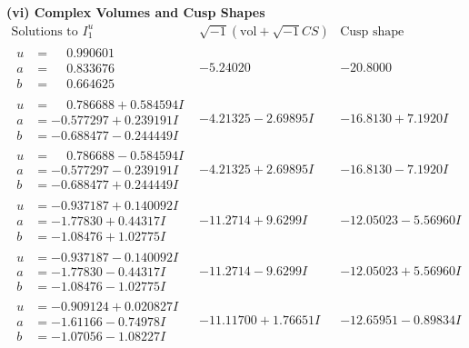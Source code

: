 \documentclass[1p]{elsarticle_modified}
\theoremstyle{definition}
\newcommand{\I}{\sqrt{-1}}
\begin{document}
\newpage\flushleft \textbf{(vi) Complex Volumes and Cusp Shapes}
$$\begin{array}{c|c|c}  
\text{Solutions to }I^u_{1}& \I (\text{vol} + \sqrt{-1}CS) & \text{Cusp shape}\\
 \hline 
\begin{aligned}
u &= \phantom{-}0.990601\phantom{ +0.000000I} \\
a &= \phantom{-}0.833676\phantom{ +0.000000I} \\
b &= \phantom{-}0.664625\phantom{ +0.000000I}\end{aligned}
 & -5.24020\phantom{ +0.000000I} & -20.8000\phantom{ +0.000000I} \\ \hline\begin{aligned}
u &= \phantom{-}0.786688 + 0.584594 I \\
a &= -0.577297 + 0.239191 I \\
b &= -0.688477 - 0.244449 I\end{aligned}
 & -4.21325 - 2.69895 I & -16.8130 + 7.1920 I \\ \hline\begin{aligned}
u &= \phantom{-}0.786688 - 0.584594 I \\
a &= -0.577297 - 0.239191 I \\
b &= -0.688477 + 0.244449 I\end{aligned}
 & -4.21325 + 2.69895 I & -16.8130 - 7.1920 I \\ \hline\begin{aligned}
u &= -0.937187 + 0.140092 I \\
a &= -1.77830 + 0.44317 I \\
b &= -1.08476 + 1.02775 I\end{aligned}
 & -11.2714 + 9.6299 I & -12.05023 - 5.56960 I \\ \hline\begin{aligned}
u &= -0.937187 - 0.140092 I \\
a &= -1.77830 - 0.44317 I \\
b &= -1.08476 - 1.02775 I\end{aligned}
 & -11.2714 - 9.6299 I & -12.05023 + 5.56960 I \\ \hline\begin{aligned}
u &= -0.909124 + 0.020827 I \\
a &= -1.61166 - 0.74978 I \\
b &= -1.07056 - 1.08227 I\end{aligned}
 & -11.11700 + 1.76651 I & -12.65951 - 0.89834 I \\ \hline\begin{aligned}

\end{aligned}
\end{array}$$
\end{document}
